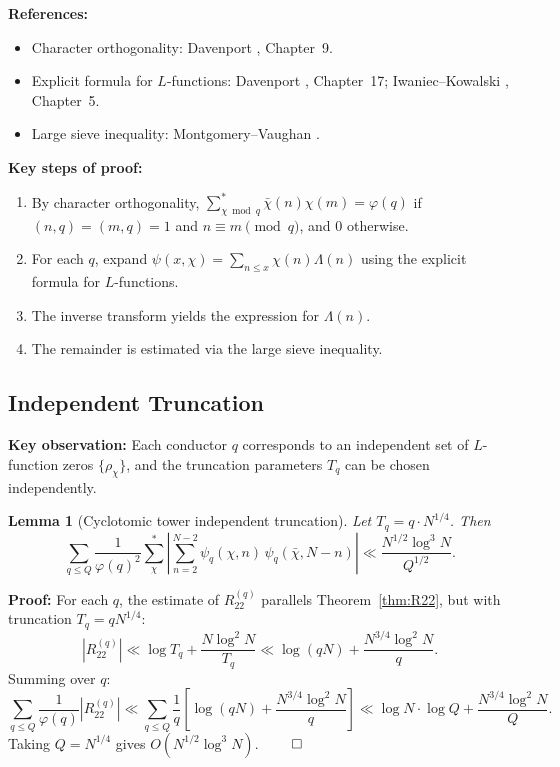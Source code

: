 \documentclass[11pt,a4paper]{article}
\newtheorem{lemma}[theorem]{Lemma}
\theoremstyle{remark}
\begin{document}
\noindent\textbf{References:}
\begin{itemize}
\item Character orthogonality: Davenport \cite{davenport}, Chapter~9.
\item Explicit formula for $L$-functions: Davenport \cite{davenport}, Chapter~17; Iwaniec--Kowalski \cite{iwaniec}, Chapter~5.
\item Large sieve inequality: Montgomery--Vaughan \cite{montgomery}.
\end{itemize}

\noindent\textbf{Key steps of proof:}
\begin{enumerate}
\item By character orthogonality, $\sum_{\chi \bmod q}^* \bar\chi(n)\chi(m) = \varphi(q)$ if $(n,q)=(m,q)=1$ and $n \equiv m \pmod{q}$, and $0$ otherwise.
\item For each $q$, expand $\psi(x,\chi) = \sum_{n \leq x} \chi(n)\Lambda(n)$ using the explicit formula for $L$-functions.
\item The inverse transform yields the expression for $\Lambda(n)$.
\item The remainder is estimated via the large sieve inequality.
\end{enumerate}

\subsection{Independent Truncation}

\noindent\textbf{Key observation:} Each conductor $q$ corresponds to an independent set of $L$-function zeros $\{\rho_\chi\}$, and the truncation parameters $T_q$ can be chosen independently.

\begin{lemma}[Cyclotomic tower independent truncation]\label{lem:cyclo}
Let $T_q = q \cdot N^{1/4}$. Then
\begin{equation}\label{eq:cyclobound}
\sum_{q \leq Q} \frac{1}{\varphi(q)^2} \sum_\chi^* \left|\sum_{n=2}^{N-2} \psi_q(\chi,n)\,\psi_q(\bar\chi, N-n)\right| \ll \frac{N^{1/2}\log^3 N}{Q^{1/2}}.
\end{equation}
\end{lemma}

\noindent\textbf{Proof:} For each $q$, the estimate of $R_{22}^{(q)}$ parallels Theorem~\ref{thm:R22}, but with truncation $T_q = q N^{1/4}$:
\[
|R_{22}^{(q)}| \ll \log T_q + \frac{N\log^2 N}{T_q} \ll \log(qN) + \frac{N^{3/4}\log^2 N}{q}.
\]
Summing over $q$:
\[
\sum_{q \leq Q} \frac{1}{\varphi(q)} |R_{22}^{(q)}| \ll \sum_{q \leq Q} \frac{1}{q}\left[\log(qN) + \frac{N^{3/4}\log^2 N}{q}\right] \ll \log N \cdot \log Q + \frac{N^{3/4}\log^2 N}{Q}.
\]
Taking $Q = N^{1/4}$ gives $O(N^{1/2}\log^3 N)$. $\qed$
\end{document}
